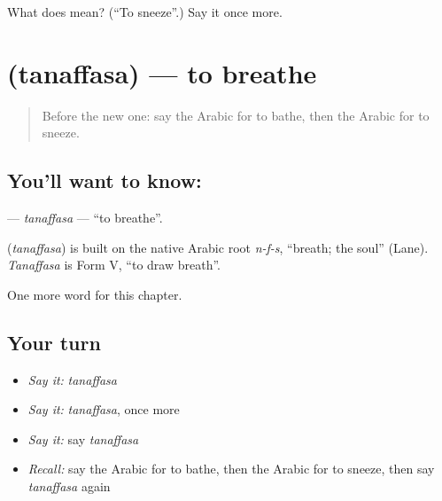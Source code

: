 \begin{tcolorbox}[breakable,colback=teal!4,colframe=teal!35!black,title={Before you move on}]
What does  mean? (\textquotedblleft{}To sneeze\textquotedblright{}.) Say it once more.
\end{tcolorbox}
\section[\texorpdfstring{\ar{تنفس} (tanaffasa)}{تنفس (tanaffasa)}]{ (tanaffasa) — to breathe}

\label{lesson:AR-C161-tanaffasa}



\begin{quote}
Before the new one: say the Arabic for to bathe, then the Arabic for to sneeze.
\end{quote}

\subsection*{You'll want to know: }
\textbf{} — \emph{tanaffasa} — \textquotedblleft{}to breathe\textquotedblright{}.

\begin{cousinweb}
\textbf{} (\emph{tanaffasa}) is built on the native Arabic root \emph{n-f-s}, \textquotedblleft{}breath; the soul\textquotedblright{} (Lane). \emph{Tanaffasa} is Form V, \textquotedblleft{}to draw breath\textquotedblright{}.
\end{cousinweb}

\begin{grammarlens}[title={What you've built}]
One more word for this chapter.
\end{grammarlens}

\subsection*{Your turn}
\begin{itemize}
\raggedright
  \item \emph{Say it:} \emph{tanaffasa}
  \item \emph{Say it:} \emph{tanaffasa}, once more
  \item \emph{Say it:} say \emph{tanaffasa}
  \item \emph{Recall:} say the Arabic for to bathe, then the Arabic for to sneeze, then say \emph{tanaffasa} again
\end{itemize}

